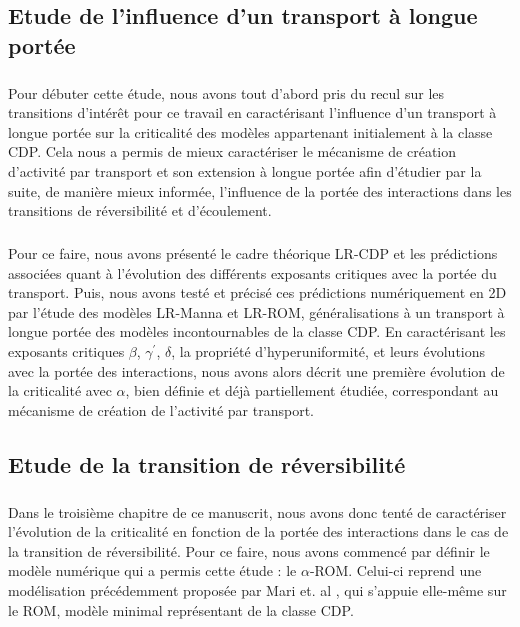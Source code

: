 \subsection*{Etude de l'influence d'un transport à longue portée}

\subparagraph{}Pour débuter cette étude, nous avons tout d'abord pris du recul sur les transitions d'intérêt pour ce travail en caractérisant l'influence d'un transport à longue portée sur la criticalité des modèles appartenant initialement à la classe CDP. Cela nous a permis de mieux caractériser le mécanisme de création d'activité par transport et son extension à longue portée afin d'étudier par la suite, de manière mieux informée, l'influence de la portée des interactions dans les transitions de réversibilité et d'écoulement. 

\subparagraph{}Pour ce faire, nous avons présenté le cadre théorique LR-CDP et les prédictions associées quant à l'évolution des différents exposants critiques avec la portée du transport. Puis, nous avons testé et précisé ces prédictions numériquement en 2D par l'étude des modèles LR-Manna et LR-ROM, généralisations à un transport à longue portée des modèles incontournables de la classe CDP. En caractérisant les exposants critiques $\beta$, $\gamma^\prime$, $\delta$, la propriété d'hyperuniformité, et leurs évolutions avec la portée des interactions, nous avons alors décrit une première évolution de la criticalité avec $\alpha$, bien définie et déjà partiellement étudiée, correspondant au mécanisme de création de l'activité par transport.

\subsection*{Etude de la transition de réversibilité}

\subparagraph{}Dans le troisième chapitre de ce manuscrit, nous avons donc tenté de caractériser l'évolution de la criticalité en fonction de la portée des interactions dans le cas de la transition de réversibilité. Pour ce faire, nous avons commencé par définir le modèle numérique qui a permis cette étude : le $\alpha$-ROM. Celui-ci reprend une modélisation précédemment proposée par Mari et. al \cite{mari_absorbing_2022}, qui s'appuie elle-même sur le ROM, modèle minimal représentant de la classe CDP. 

